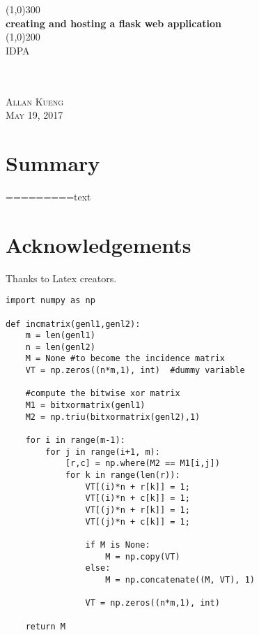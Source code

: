 \documentclass{article}
\begin{document}
\begin{titlepage}
    \begin{center}
    \line(1,0){300} \\ %
    [3mm]%
    \huge{\bfseries creating and hosting a flask web application} \\
    [2mm]%
    \line(1,0){200} \\ %
    [1.5cm]%
    \textsc{\LARGE IDPA} \\
    [0.75cm]
     \\
    \\
    [9cm]
    \end{center}
    \begin{flushright}
    \textsc{\large Allan Kueng\\
    May 19, 2017 \\}
    \end{flushright}
\end{titlepage}


\section*{Summary}
=========text
\cleardoublepage



\section*{Acknowledgements}
Thanks to Latex creators.



\begin{lstlisting}
import numpy as np

def incmatrix(genl1,genl2):
    m = len(genl1)
    n = len(genl2)
    M = None #to become the incidence matrix
    VT = np.zeros((n*m,1), int)  #dummy variable

    #compute the bitwise xor matrix
    M1 = bitxormatrix(genl1)
    M2 = np.triu(bitxormatrix(genl2),1)

    for i in range(m-1):
        for j in range(i+1, m):
            [r,c] = np.where(M2 == M1[i,j])
            for k in range(len(r)):
                VT[(i)*n + r[k]] = 1;
                VT[(i)*n + c[k]] = 1;
                VT[(j)*n + r[k]] = 1;
                VT[(j)*n + c[k]] = 1;

                if M is None:
                    M = np.copy(VT)
                else:
                    M = np.concatenate((M, VT), 1)

                VT = np.zeros((n*m,1), int)

    return M
\end{lstlisting}
\end{document}
